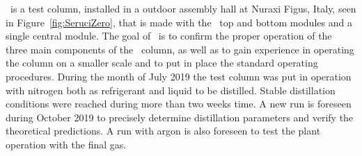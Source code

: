 \SeruciZero\ is a  test column,  installed in a outdoor assembly hall at Nuraxi Figus, Italy, seen in Figure~\ref{fig:SeruciZero}, that is made with the  \SeruciOne\ top and bottom modules and  a single central module.  The goal  of \SeruciZero\ is  to confirm the proper operation of the three main components of the \SeruciOne\ column, as well as to gain experience in operating the column on a smaller scale and to put in place the standard operating procedures.  
During the month of July 2019 the test column was put in operation with nitrogen both as refrigerant and liquid to be distilled. Stable distillation conditions were reached during more than two weeks time. A new run is foreseen during October 2019 to precisely determine distillation parameters and verify the theoretical predictions. A run with argon is also foreseen to test the plant operation with the final gas.

